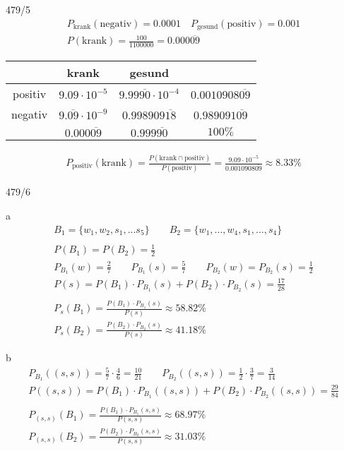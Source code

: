 \begin{exercise}{479/5}
  \begin{gather*}
    P_{\text{krank}}(\text{negativ}) = 0.0001 \quad P_{\text{gesund}}(\text{positiv}) = 0.001 \\
    P(\text{krank}) = \frac{100}{1100000} = 0.000\overline{09}
  \end{gather*}
  \begin{tabular}{c|c|c|c}
    & krank & gesund & \\ \hline
    positiv & $9.09 \cdot 10^{-5}$ & $9.99\overline{90} \cdot 10^{-4}$ & $0.0010908\overline{09}$ \\ \hline
    negativ & $9.\overline{09} \cdot 10^{-9}$ & $0.998909\overline{18}$ & $0.989091\overline{09}$ \\ \hline
    & $0.000\overline{09}$ & $0.999\overline{90}$ & $100\%$
  \end{tabular}
  \begin{gather*}
    P_{\text{positiv}}(\text{krank}) = \frac{P(\text{krank} \cap \text{positiv})}{P(\text{positiv})} = \frac{9.09 \cdot 10^{-5}}{0.0010908\overline{09}} \approx 8.33\%
  \end{gather*}
\end{exercise}
\newpage
\begin{exercise}{479/6}
  \item [a]
  \begin{gather*}
    B_1 = \{w_1, w_2, s_1, ... s_5\} \qquad B_2 = \{w_1, ..., w_4, s_1, ..., s_4\} \\\\
    P(B_1) = P(B_2) = \frac{1}{2} \\
    P_{B_1}(w) = \frac{2}{7} \qquad P_{B_1}(s) = \frac{5}{7} \qquad P_{B_2}(w) = P_{B_2}(s) = \frac{1}{2} \\
    P(s) = P(B_1) \cdot P_{B_1}(s) + P(B_2) \cdot P_{B_2}(s) = \frac{17}{28} \\\\
    P_s(B_1) = \frac{P(B_1) \cdot P_{B_1}(s)}{P(s)} \approx 58.82\% \\
    P_s(B_2) = \frac{P(B_2) \cdot P_{B_2}(s)}{P(s)} \approx 41.18\%
  \end{gather*}
  \item [b]
  \begin{gather*}
    P_{B_1}((s, s)) = \frac{5}{7} \cdot \frac{4}{6} = \frac{10}{21} \qquad P_{B_2}((s, s)) = \frac{1}{2} \cdot \frac{3}{7} = \frac{3}{14} \\
    P((s, s)) = P(B_1) \cdot P_{B_1}((s, s)) + P(B_2) \cdot P_{B_2}((s, s)) = \frac{29}{84} \\\\
    P_{(s, s)}(B_1) = \frac{P(B_1) \cdot P_{B_1}(s, s)}{P(s, s)} \approx 68.97\% \\
    P_{(s, s)}(B_2) = \frac{P(B_2) \cdot P_{B_2}(s, s)}{P(s, s)} \approx 31.03\%
  \end{gather*}
\end{exercise}
